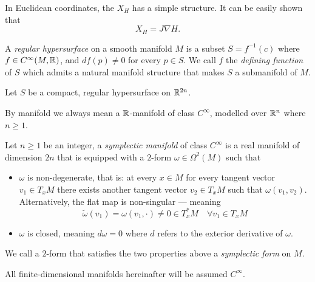 \documentclass[../main-v2-manifolds.tex]{subfiles}
\begin{document}
In Euclidean coordinates, the $X_H$ has a simple structure. It can be easily shown that
\[X_H = J\nabla H.\]
\begin{definition}\label{def:regular hypersurface}
    A \emph{regular hypersurface} on a smooth manifold $M$ is a subset $S = f^{-1}(c)$ where $f\in C^\infty(M,\mathbb{R})$, and $df(p)\neq 0$ for every $p\in S$. We call $f$ the \emph{defining function} of $S$ which admits a natural manifold structure that makes $S$ a submanifold of $M$. 
\end{definition}
\begin{wts}
    Let $S$ be a compact, regular hypersurface on ${\mathbb{R}^{2n}}$.
\end{wts}
\begin{remark}
    By manifold we always mean a $\mathbb{R}$-manifold of class $C^\infty$, modelled over ${\mathbb{R}^n}$ where $n\geq 1$.
\end{remark}
%
%
%
Let $n\geq 1$ be an integer, a \emph{symplectic manifold} of class $C^\infty$ is a real manifold of dimension $2n$ that is equipped with a $2$-form $\omega\in \Omega^2(M)$ such that
\begin{itemize}
    \item $\omega$ is non-degenerate, that is: at every $x\in M$ for every tangent vector $v_1\in T_xM$ there exists another tangent vector $v_2\in T_xM$ such that $\omega(v_1,v_2)$. Alternatively, the flat map is non-singular --- meaning
    \[
        \breve{\omega}(v_1) = \omega(v_1,\cdot) \neq 0\in T^*_xM\quad\forall v_1\in T_xM
    \]
    \item $\omega$ is closed, meaning $d\omega=0$ where $d$ refers to the exterior derivative of $\omega$.
\end{itemize}
We call a $2$-form that satisfies the two properties above a \emph{symplectic form} on $M$. 
\begin{remark}
    All finite-dimensional manifolds hereinafter will be assumed $C^\infty$.
\end{remark}
\end{document}
